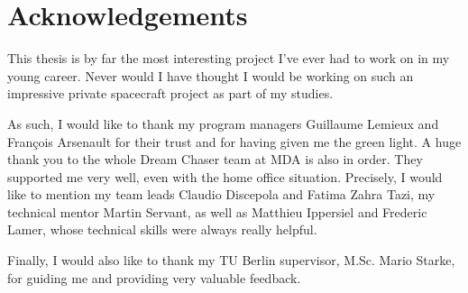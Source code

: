 \chapter*{Acknowledgements}\label{cha:ack}
This thesis is by far the most interesting project I've ever had to work on in my young career. Never would I have thought I would be working on such an impressive private spacecraft project as part of my studies. 

As such, I would like to thank my program managers Guillaume Lemieux and François Arsenault for their trust and for having given me the green light. A huge thank you to the whole Dream Chaser team at MDA is also in order. They supported me very well, even with the home office situation. Precisely, I would like to mention my team leads Claudio Discepola and Fatima Zahra Tazi, my technical mentor Martin Servant, as well as Matthieu Ippersiel and Frederic Lamer, whose technical skills were always really helpful.

Finally, I would also like to thank my TU Berlin supervisor, M.Sc. Mario Starke, for guiding me and providing very valuable feedback. 